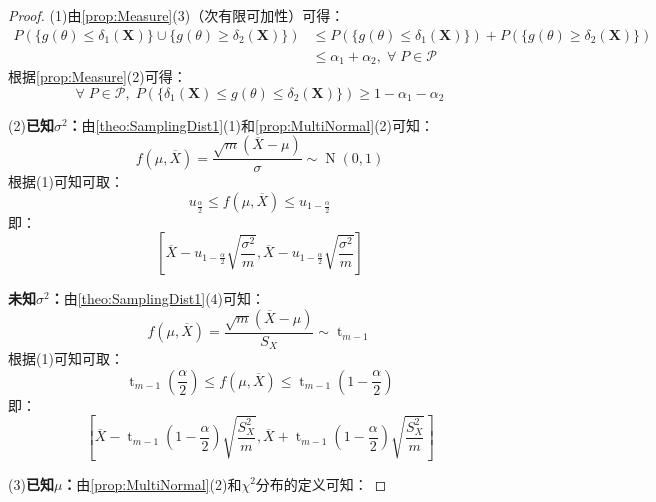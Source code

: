 \begin{proof}
	(1)由\cref{prop:Measure}(3)（次有限可加性）可得：
	\begin{align*}
		P(\{g(\theta)\leqslant\delta_1(\mathbf{X})\}\cup\{g(\theta)\geqslant\delta_2(\mathbf{X})\})&\leqslant P(\{g(\theta)\leqslant\delta_1(\mathbf{X})\})+P(\{g(\theta)\geqslant\delta_2(\mathbf{X})\}) \\
		&\leqslant\alpha_1+\alpha_2,\;\forall\;P\in\mathscr{P}
	\end{align*}
	根据\cref{prop:Measure}(2)可得：
	\begin{equation*}
		\forall\;P\in\mathscr{P},\;P\left(\{\delta_1(\mathbf{X})\leqslant g(\theta)\leqslant\delta_2(\mathbf{X})\}\right)\geqslant1-\alpha_1-\alpha_2
	\end{equation*}\par
	(2)\textbf{已知$\sigma^2$：}由\cref{theo:SamplingDist1}(1)和\cref{prop:MultiNormal}(2)可知：
	\begin{equation*}
		f(\mu,\overline{X})=\frac{\sqrt{m}(\overline{X}-\mu)}{\sigma}\sim\operatorname{N}(0,1)
	\end{equation*}
	根据(1)可知可取：
	\begin{equation*}
		u_{\frac{\alpha}{2}}\leqslant f(\mu,\overline{X})\leqslant u_{1-\frac{\alpha}{2}}
	\end{equation*}
	即：
	\begin{equation*}
		\left[\overline{X}-u_{1-\frac{\alpha}{2}}\sqrt{\dfrac{\sigma^2}{m}},\overline{X}-u_{1-\frac{\alpha}{2}}\sqrt{\dfrac{\sigma^2}{m}}\right]
	\end{equation*}\par
	\textbf{未知$\sigma^2$：}由\cref{theo:SamplingDist1}(4)可知：
	\begin{equation*}
		f(\mu,\overline{X})=\frac{\sqrt{m}(\overline{X}-\mu)}{S_X}\sim\operatorname{t}_{m-1}
	\end{equation*}
	根据(1)可知可取：
	\begin{equation*}
		\operatorname{t}_{m-1}\left(\frac{\alpha}{2}\right)\leqslant f(\mu,\overline{X})\leqslant\operatorname{t}_{m-1}\left(1-\frac{\alpha}{2}\right)
	\end{equation*}
	即：
	\begin{equation*}
		\left[\overline{X}-\operatorname{t}_{m-1}\left(1-\frac{\alpha}{2}\right)\sqrt{\dfrac{S_X^2}{m}},\overline{X}+\operatorname{t}_{m-1}\left(1-\frac{\alpha}{2}\right)\sqrt{\dfrac{S_X^2}{m}}\right]
	\end{equation*}\par
	(3)\textbf{已知$\mu$：}由\cref{prop:MultiNormal}(2)和$\chi^2$分布的定义可知：

\end{proof}
